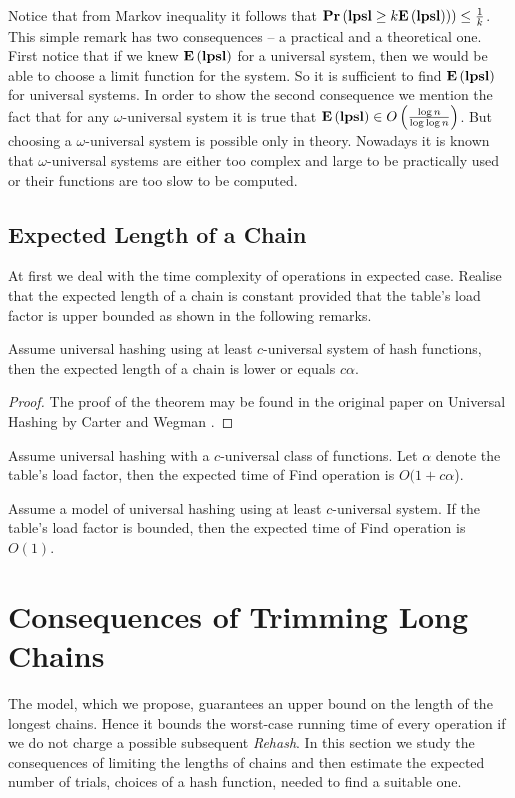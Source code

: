 Notice that from Markov inequality it follows that $\mathbf{Pr}\left(\mathbf{lpsl} \geq k \mathbf{E}\left(\mathbf{lpsl}\right))\right) \leq \frac{1}{k}$. This simple remark has two consequences -- a practical and a theoretical one. First notice that if we knew $\mathbf{E}\left(\mathbf{lpsl}\right)$ for a universal system, then we would be able to choose a limit function for the system. So it is sufficient to find $\mathbf{E}\left(\mathbf{lpsl}\right)$ for universal systems. In order to show the second consequence we mention the fact that for any $\omega$-universal system it is true that $\mathbf{E}\left(\mathbf{lpsl}\right) \in O\left(\frac{\log n}{\log \log n}\right)$. But choosing a $\omega$-universal system is possible only in theory. Nowadays it is known that $\omega$-universal systems are either too complex and large to be practically used or their functions are too slow to be computed.

\subsection{Expected Length of a Chain}
At first we deal with the time complexity of operations in expected case. Realise that the expected length of a chain is constant provided that the table's load factor is upper bounded as shown in the following remarks. 
\begin{theorem}
\label{theorem-expected-chain-length-universal}
Assume universal hashing using at least $c$-universal system of hash functions, then the expected length of a chain is lower or equals $c \alpha$.
\begin{proof}
The proof of the theorem may be found in the original paper on Universal Hashing by Carter and Wegman \cite{DBLP:journals/jcss/CarterW79}.
\end{proof}
\end{theorem}
\begin{corollary}
\label{corollary-c-universal-find}
Assume universal hashing with a $c$-universal class of functions. Let $\alpha$ denote the table's load factor, then the expected time of Find operation is $O(1 + c\alpha$).
\end{corollary}
\begin{corollary}
\label{corollary-find-time}
Assume a model of universal hashing using at least $c$-universal system. If the table's load factor is bounded, then the expected time of Find operation is $O(1)$.
\end{corollary}

\section{Consequences of Trimming Long Chains}
The model, which we propose, guarantees an upper bound on the length of the longest chains. Hence it bounds the worst-case running time of every operation if we do not charge a possible subsequent \emph{Rehash}. In this section we study the consequences of limiting the lengths of chains and then estimate the expected number of trials, choices of a hash function, needed to find a suitable one. 

